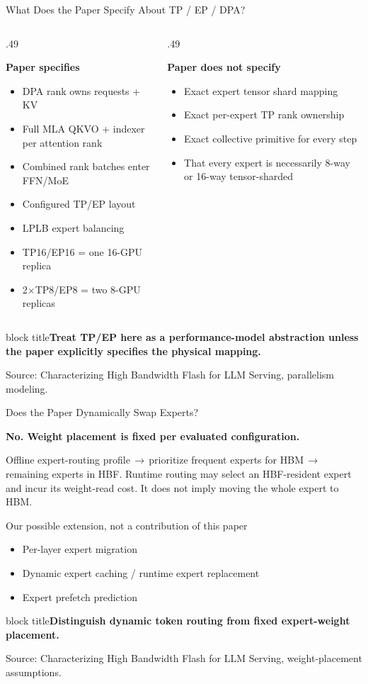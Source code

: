 \documentclass[aspectratio=169,10pt]{beamer}
\newcommand{\takeaway}[1]{\par\vspace{.12cm}\begin{beamercolorbox}[rounded=true,sep=.12cm,wd=\linewidth]{block title}\small\bfseries #1\end{beamercolorbox}}
\newcommand{\src}[1]{\par\vfill{\fontsize{7}{8}\selectfont\color{Muted}Source: Characterizing High Bandwidth Flash for LLM Serving, #1.}\par}
\newcommand{\head}[1]{\par{\color{Accent}\bfseries #1}\par\smallskip}
\newcommand{\arr}{\,$\rightarrow$\,}
\begin{document}
\begin{frame}[t]{What Does the Paper Specify About TP / EP / DPA?}

\begin{columns}[T,onlytextwidth]
\begin{column}{.49\textwidth}
\head{Paper specifies}
\begin{itemize}
\item DPA rank owns requests + KV
\item Full MLA QKVO + indexer per attention rank
\item Combined rank batches enter FFN/MoE
\item Configured TP/EP layout
\item LPLB expert balancing
\item TP16/EP16 = one 16-GPU replica
\item 2$\times$TP8/EP8 = two 8-GPU replicas
\end{itemize}
\end{column}
\begin{column}{.49\textwidth}
\head{Paper does not specify}
\begin{itemize}
\item Exact expert tensor shard mapping
\item Exact per-expert TP rank ownership
\item Exact collective primitive for every step
\item That every expert is necessarily 8-way or 16-way tensor-sharded
\end{itemize}
\end{column}
\end{columns}
\takeaway{Treat TP/EP here as a performance-model abstraction unless the paper explicitly specifies the physical mapping.}
\src{parallelism modeling}
\end{frame}

\begin{frame}[t]{Does the Paper Dynamically Swap Experts?}

\head{No. Weight placement is fixed per evaluated configuration.}
\vspace{.2cm}
Offline expert-routing profile\arr prioritize frequent experts for HBM\arr remaining experts in HBF.
\vspace{.3cm}
Runtime routing may select an HBF-resident expert and incur its weight-read cost. It does not imply moving the whole expert to HBM.
\begin{block}{Our possible extension, not a contribution of this paper}
\begin{itemize}
\item Per-layer expert migration
\item Dynamic expert caching / runtime expert replacement
\item Expert prefetch prediction
\end{itemize}
\end{block}
\takeaway{Distinguish dynamic token routing from fixed expert-weight placement.}

\src{weight-placement assumptions}
\end{frame}
\end{document}

